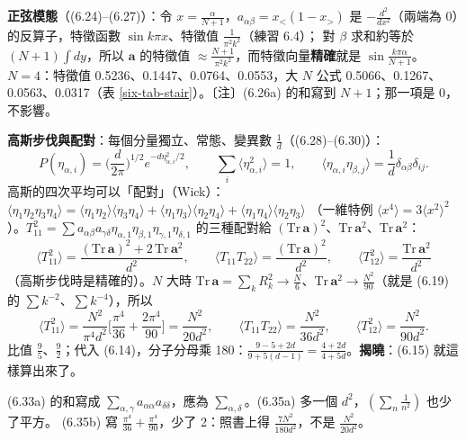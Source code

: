 \textbf{正弦模態}（(6.24)--(6.27)）：令 $x=\frac{\alpha}{N+1}$，$a_{\alpha\beta}=x_<(1-x_>)$ 是 $-\frac{d^2}{dx^2}$（兩端為 0）的反算子，特徵函數 $\sin k\pi x$、特徵值 $\frac1{\pi^2k^2}$（練習 6.4）；
對 $\beta$ 求和約等於 $(N+1)\int dy$，所以 $\mathbf a$ 的特徵值 $\approx\frac{N+1}{\pi^2k^2}$，而特徵向量\textbf{精確}就是 $\sin\frac{k\pi\alpha}{N+1}$。
$N=4$：特徵值 0.5236、0.1447、0.0764、0.0553，大 $N$ 公式 0.5066、0.1267、0.0563、0.0317（表 \ref{six-tab-stair}）。〔注〕(6.26a) 的和寫到 $N+1$；那一項是 0，不影響。

\textbf{高斯步伐與配對}：每個分量獨立、常態、變異數 $\frac1d$（(6.28)--(6.30)）：
\[P(\eta_{\alpha,i})=\Big(\frac{d}{2\pi}\Big)^{1/2}e^{-d\eta_{\alpha,i}^2/2},\qquad \sum_i\langle\eta_{\alpha,i}^2\rangle=1,\qquad \langle\eta_{\alpha,i}\eta_{\beta,j}\rangle=\frac1d\delta_{\alpha\beta}\delta_{ij}.\]
高斯的四次平均可以「配對」（Wick）：$\langle\eta_1\eta_2\eta_3\eta_4\rangle=\langle\eta_1\eta_2\rangle\langle\eta_3\eta_4\rangle+\langle\eta_1\eta_3\rangle\langle\eta_2\eta_4\rangle+\langle\eta_1\eta_4\rangle\langle\eta_2\eta_3\rangle$
（一維特例 $\langle x^4\rangle=3\langle x^2\rangle^2$）。$T_{11}^2=\sum a_{\alpha\beta}a_{\gamma\delta}\eta_{\alpha,1}\eta_{\beta,1}\eta_{\gamma,1}\eta_{\delta,1}$ 的三種配對給 $(\mathrm{Tr}\,\mathbf a)^2$、$\mathrm{Tr}\,\mathbf a^2$、$\mathrm{Tr}\,\mathbf a^2$：
\[\langle T_{11}^2\rangle=\frac{(\mathrm{Tr}\,\mathbf a)^2+2\,\mathrm{Tr}\,\mathbf a^2}{d^2},\qquad \langle T_{11}T_{22}\rangle=\frac{(\mathrm{Tr}\,\mathbf a)^2}{d^2},\qquad
\langle T_{12}^2\rangle=\frac{\mathrm{Tr}\,\mathbf a^2}{d^2}\tag{6.33, 6.36, 6.37}\]
（高斯步伐時是精確的）。$N$ 大時 $\mathrm{Tr}\,\mathbf a=\sum_kR_k^2\to\frac N6$、$\mathrm{Tr}\,\mathbf a^2\to\frac{N^2}{90}$（就是 (6.19) 的 $\sum k^{-2}$、$\sum k^{-4}$），所以
\[\langle T_{11}^2\rangle=\frac{N^2}{\pi^4d^2}\Big[\frac{\pi^4}{36}+\frac{2\pi^4}{90}\Big]=\frac{N^2}{20d^2},\qquad \langle T_{11}T_{22}\rangle=\frac{N^2}{36d^2},\qquad \langle T_{12}^2\rangle=\frac{N^2}{90d^2}.\tag{6.35--6.37}\]
比值 $\frac95$、$\frac92$；代入 (6.14)，分子分母乘 180：$\frac{9-5+2d}{9+5(d-1)}=\frac{4+2d}{4+5d}$。\textbf{揭曉}：(6.15) 就這樣算出來了。
\begin{errbox}[p.~141，(6.33a)(6.35a)(6.35b)]
(6.33a) 的和寫成 $\sum_{\alpha,\gamma}a_{\alpha\alpha}a_{\delta\delta}$，應為 $\sum_{\alpha,\delta}$。(6.35a) 多一個 $d^2$，$(\sum_n\frac1{n^2})$ 也少了平方。
(6.35b) 寫 $\frac{\pi^4}{36}+\frac{\pi^4}{90}$，少了 2：照書上得 $\frac{7N^2}{180d^2}$，不是 $\frac{N^2}{20d^2}$。
\end{errbox}

